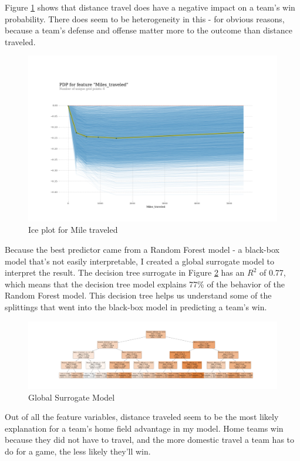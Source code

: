 \documentclass[12pt, letterpaper, twoside]{article}
\begin{document}
Figure \ref{fig:ice} shows that distance travel does have a negative impact on a team's win probability. There does seem to be heterogeneity in this - for obvious reasons, because a team's defense and offense matter more to the outcome than distance traveled.

\begin{figure}[H]%
	\centering
   \includegraphics[width=0.5\linewidth]{../09_figures/ice_plot.png} 
    \caption{Ice plot for Mile traveled}
    \label{fig:ice}%
\end{figure}


Because the best predictor came from a Random Forest model - a black-box model that's not easily interpretable, I created a global surrogate model to interpret the result. The decision tree surrogate in Figure \ref{fig:tree} has an $R^2$ of 0.77, which means that the decision tree model explains 77\% of the behavior of the Random Forest model. This decision tree helps us understand some of the splittings that went into the black-box model in predicting a team's win. 

\begin{figure}[H]%
\hspace*{-4.5cm}
   \includegraphics[width=1.5\textwidth]{../09_figures/decision_tree.png} 
    \caption{Global Surrogate Model}
    \label{fig:tree}%
\end{figure}

Out of all the feature variables, distance traveled seem to be the most likely explanation for a team's home field advantage in my model. Home teams win because they did not have to travel, and the more domestic travel a team has to do for a game, the less likely they'll win. 
\end{document}
